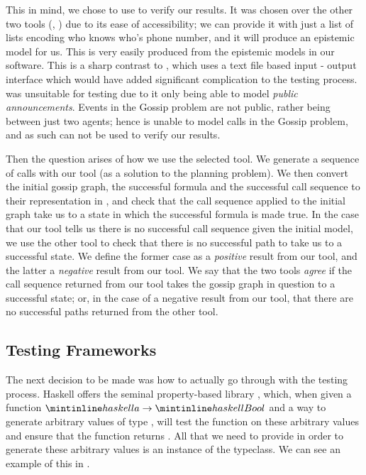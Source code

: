 \documentclass[10pt, a4paper]{report}
\begin{document}
This in mind, we chose to use \cite{GithubGossip} to verify our results. It was
chosen over the other two tools (\cite{SMCDEL}, \cite{DEMO-S5}) due to its ease
of accessibility; we can provide it with just a list of lists encoding who knows
who's phone number, and it will produce an epistemic model for us. This is very
easily produced from the epistemic models in our software. This is a sharp
contrast to \cite{SMCDEL}, which uses a text file based input - output interface
which would have added significant complication to the testing process.
\cite{DEMO-S5} was unsuitable for testing due to it only being able to model
\emph{public announcements}. Events in the Gossip problem are not public, rather
being between just two agents; hence \cite{DEMO-S5} is unable to model calls in
the Gossip problem, and as such can not be used to verify our results.

Then the question arises of how we use the selected tool. We generate a sequence
of calls with our tool (as a solution to the planning problem). We then convert
the initial gossip graph, the successful formula and the successful call
sequence to their representation in \cite{GithubGossip}, and check that the call
sequence applied to the initial graph take us to a state in which the successful
formula is made true. In the case that our tool tells us there is no successful
call sequence given the initial model, we use the other tool to check that
there is no successful path to take us to a successful state. We define the
former case as a \emph{positive} result from our tool, and the latter a
\emph{negative} result from our tool. We say that the two tools \emph{agree} if
the call sequence returned from our tool takes the gossip graph in question to a
successful state; or, in the case of a negative result from our tool, that there
are no successful paths returned from the other tool.

\subsection{Testing Frameworks}
\label{sec:TestingFrameworks}

The next decision to be made was how to actually go through with the testing
process. Haskell offers the seminal property-based library ,
which, when given a function $\mih{a} \rightarrow \mih{Bool}$ and a way to
generate arbitrary values of type , will test the function on these
arbitrary values and ensure that the function returns . All that we need
to provide in order to generate these arbitrary values is an instance of the
 typeclass. We can see an example of this in .
\end{document}
